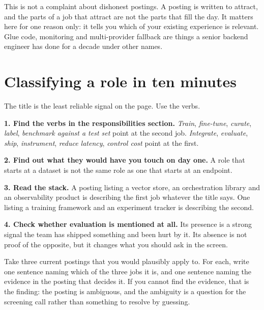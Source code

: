 \begin{kitnote}
This is not a complaint about dishonest postings. A posting is written to
attract, and the parts of a job that attract are not the parts that fill the
day. It matters here for one reason only: it tells you which of your existing
experience is relevant. Glue code, monitoring and multi-provider fallback are
things a senior backend engineer has done for a decade under other names.
\end{kitnote}

\section{Classifying a role in ten minutes}

The title is the least reliable signal on the page. Use the verbs.

\begin{kitmethod}
\textbf{1. Find the verbs in the responsibilities section.} \emph{Train},
\emph{fine-tune}, \emph{curate}, \emph{label}, \emph{benchmark against a test
set} point at the second job. \emph{Integrate}, \emph{evaluate}, \emph{ship},
\emph{instrument}, \emph{reduce latency}, \emph{control cost} point at the
first.

\textbf{2. Find out what they would have you touch on day one.} A role that
starts at a dataset is not the same role as one that starts at an endpoint.

\textbf{3. Read the stack.} A posting listing a vector store, an orchestration
library and an observability product is describing the first job whatever the
title says. One listing a training framework and an experiment tracker is
describing the second.

\textbf{4. Check whether evaluation is mentioned at all.} Its presence is a
strong signal the team has shipped something and been hurt by it. Its absence
is not proof of the opposite, but it changes what you should ask in the screen.
\end{kitmethod}

\begin{drill}
Take three current postings that you would plausibly apply to. For each, write
one sentence naming which of the three jobs it is, and one sentence naming the
evidence in the posting that decides it. If you cannot find the evidence, that
is the finding: the posting is ambiguous, and the ambiguity is a question for
the screening call rather than something to resolve by guessing.
\end{drill}

